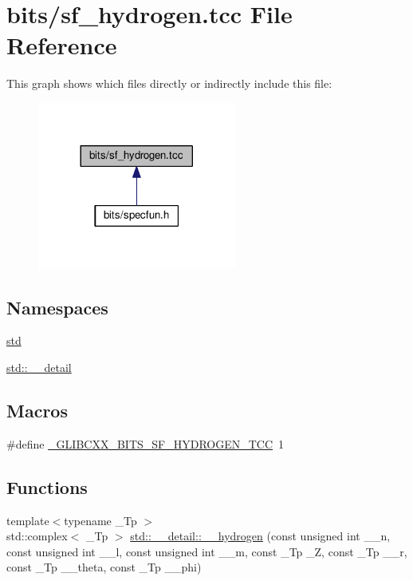 \hypertarget{sf__hydrogen_8tcc}{}\section{bits/sf\+\_\+hydrogen.tcc File Reference}
\label{sf__hydrogen_8tcc}
This graph shows which files directly or indirectly include this file\+:
\nopagebreak
\begin{figure}[H]
\begin{center}
\leavevmode
\includegraphics[width=185pt]{sf__hydrogen_8tcc__dep__incl}
\end{center}
\end{figure}
\subsection*{Namespaces}
\begin{DoxyCompactItemize}
\item 
 \hyperlink{namespacestd}{std}
\item 
 \hyperlink{namespacestd_1_1____detail}{std\+::\+\_\+\+\_\+detail}
\end{DoxyCompactItemize}
\subsection*{Macros}
\begin{DoxyCompactItemize}
\item 
\#define \hyperlink{sf__hydrogen_8tcc_af6b60d2402ae885b7f3ef4519fb65ed9}{\+\_\+\+G\+L\+I\+B\+C\+X\+X\+\_\+\+B\+I\+T\+S\+\_\+\+S\+F\+\_\+\+H\+Y\+D\+R\+O\+G\+E\+N\+\_\+\+T\+C\+C}~1
\end{DoxyCompactItemize}
\subsection*{Functions}
\begin{DoxyCompactItemize}
\item 
{\footnotesize template$<$typename \+\_\+\+Tp $>$ }\\std\+::complex$<$ \+\_\+\+Tp $>$ \hyperlink{namespacestd_1_1____detail_af8bd1ad6980e19dce3ee9eb518bc90fa}{std\+::\+\_\+\+\_\+detail\+::\+\_\+\+\_\+hydrogen} (const unsigned int \+\_\+\+\_\+n, const unsigned int \+\_\+\+\_\+l, const unsigned int \+\_\+\+\_\+m, const \+\_\+\+Tp \+\_\+\+Z, const \+\_\+\+Tp \+\_\+\+\_\+r, const \+\_\+\+Tp \+\_\+\+\_\+theta, const \+\_\+\+Tp \+\_\+\+\_\+phi)
\end{DoxyCompactItemize}


